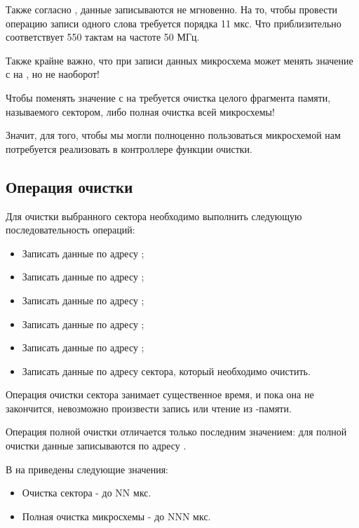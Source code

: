 \par{Также согласно , данные записываются не мгновенно. На то, чтобы провести операцию записи одного слова требуется порядка 11 мкс. Что приблизительно соответствует 550 тактам на частоте 50 МГц.}
\par{Также крайне важно, что при записи данных микросхема  может менять значение с  на , но не наоборот!}
\par{Чтобы поменять значение с  на  требуется очистка целого фрагмента памяти, называемого сектором, либо полная очистка всей микросхемы!}
\par{Значит, для того, чтобы мы могли полноценно пользоваться микросхемой  нам потребуется реализовать в контроллере функции очистки.}

\subsection{Операция очистки}
\par{Для очистки выбранного сектора необходимо выполнить следующую последовательность операций:
\begin{itemize}[noitemsep, label={}]
  \item Записать данные  по адресу ;
  \item Записать данные  по адресу ;
  \item Записать данные  по адресу ;
  \item Записать данные  по адресу ;
  \item Записать данные  по адресу ;
  \item Записать данные  по адресу сектора, который необходимо очистить.
\end{itemize}}
\par{Операция очистки сектора занимает существенное время, и пока она не закончится, невозможно произвести запись или чтение из -памяти.}
\par{Операция полной очистки отличается только последним значением: для полной очистки данные  записываются по адресу .}
\par{В  на  приведены следующие значения:
\begin{itemize}[noitemsep, label={}]
  \item Очистка сектора - до NN мкс.
  \item Полная очистка микросхемы - до NNN мкс.
\end{itemize}}



